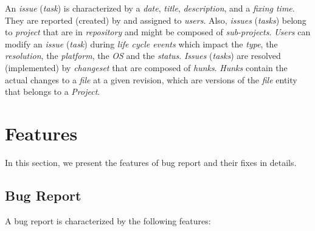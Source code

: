 An {\emph{issue}} ({\emph{task}}) is characterized by a {\emph{date}},
{\emph{title}}, {\emph{description}}, and a {\emph{fixing time}}. They
are reported (created) by and assigned to {\emph{users}}. Also,
{\emph{issues}} ({\emph{tasks}}) belong to {\emph{project}} that are in
{\emph{repository}} and might be composed of {\emph{sub-projects}}.
{\emph{Users}} can modify an {\emph{issue}} ({\emph{task}}) during
{\emph{life cycle events}} which impact the {\emph{type}}, the
{\emph{resolution}}, the {\emph{platform}}, the {\emph{OS}} and the
{\emph{status}}. {\emph{Issues}} ({\emph{tasks}}) are resolved
(implemented) by {\emph{changeset}} that are composed of {\emph{hunks}}.
{\emph{Hunks}} contain the actual changes to a {\emph{file}} at a given
revision, which are versions of the {\emph{file}} entity that belongs to
a {\emph{Project}}.

\section{Features}\label{features}

In this section, we present the features of bug report and their fixes
in details.

\subsection{Bug Report}\label{bug-report}

A bug report is characterized by the following features:

